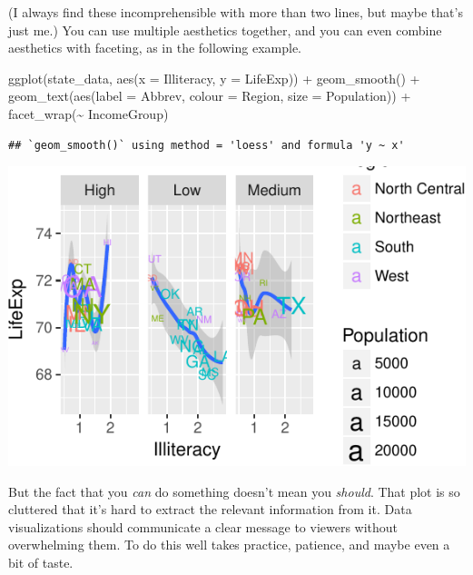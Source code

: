 \documentclass[
  12pt,
  oneside,openany]{book}
\newenvironment{Shaded}{\begin{snugshade}}{\end{snugshade}}
\newcommand{\AttributeTok}[1]{\textcolor[rgb]{0.77,0.63,0.00}{#1}}
\newcommand{\FunctionTok}[1]{\textcolor[rgb]{0.00,0.00,0.00}{#1}}
\newcommand{\NormalTok}[1]{#1}
\newcommand{\SpecialCharTok}[1]{\textcolor[rgb]{0.00,0.00,0.00}{#1}}
\begin{document}
(I always find these incomprehensible with more than two lines, but maybe that's just me.) You can use multiple aesthetics together, and you can even combine aesthetics with faceting, as in the following example.

\begin{Shaded}
\begin{Highlighting}[]
\FunctionTok{ggplot}\NormalTok{(state\_data, }\FunctionTok{aes}\NormalTok{(}\AttributeTok{x =}\NormalTok{ Illiteracy, }\AttributeTok{y =}\NormalTok{ LifeExp)) }\SpecialCharTok{+}
  \FunctionTok{geom\_smooth}\NormalTok{() }\SpecialCharTok{+}
  \FunctionTok{geom\_text}\NormalTok{(}\FunctionTok{aes}\NormalTok{(}\AttributeTok{label =}\NormalTok{ Abbrev, }\AttributeTok{colour =}\NormalTok{ Region, }\AttributeTok{size =}\NormalTok{ Population)) }\SpecialCharTok{+}
  \FunctionTok{facet\_wrap}\NormalTok{(}\SpecialCharTok{\textasciitilde{}}\NormalTok{ IncomeGroup)}
\end{Highlighting}
\end{Shaded}

\begin{verbatim}
## `geom_smooth()` using method = 'loess' and formula 'y ~ x'
\end{verbatim}

\includegraphics{pdaps_files/figure-latex/too-many-things-1.pdf}

But the fact that you \emph{can} do something doesn't mean you \emph{should}. That plot is so cluttered that it's hard to extract the relevant information from it. Data visualizations should communicate a clear message to viewers without overwhelming them. To do this well takes practice, patience, and maybe even a bit of taste.
\end{document}
